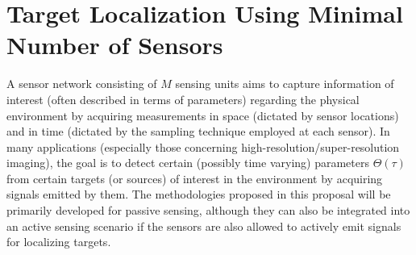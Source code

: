 \section{Target Localization Using Minimal Number of Sensors}
A sensor network consisting of $M$ sensing units aims to capture information of interest (often described in terms of parameters) regarding the physical environment by acquiring measurements in space (dictated by sensor locations) and in time (dictated by the sampling technique employed at each sensor). In many applications (especially those concerning high-resolution/super-resolution imaging), the goal is to detect certain (possibly time varying) parameters $\Theta(\tau)$ from certain targets (or sources) of interest in the environment by acquiring signals emitted by them. The methodologies proposed in this proposal will be primarily developed for passive sensing, although they can also be integrated into an active sensing scenario if the sensors are also allowed to actively emit signals for localizing targets.

 

